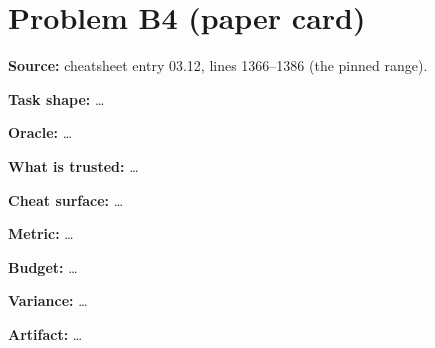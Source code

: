 \documentclass[11pt]{article}
\begin{document}
\section*{Problem B4 (paper card)}\label{ans:B4}
\begin{answer}
\textbf{Source:} cheatsheet entry 03.12, lines 1366--1386 (the pinned range).

\textbf{Task shape:} \dots

\textbf{Oracle:} \dots

\textbf{What is trusted:} \dots

\textbf{Cheat surface:} \dots

\textbf{Metric:} \dots

\textbf{Budget:} \dots

\textbf{Variance:} \dots

\textbf{Artifact:} \dots
\end{answer}
\end{document}
